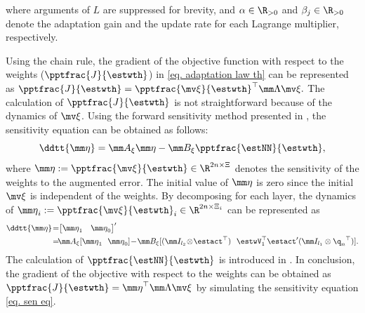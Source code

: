 \documentclass[letterpaper, 10 pt, conference]{ieeeconf}  %
\begin{document}
where arguments of $L$ are suppressed for brevity, and $\alpha\in\R_{>0}$ and $\beta_j\in\R_{>0}$ denote the adaptation gain and the update rate for each Lagrange multiplier, respectively.
\color{red}
\color{black}

Using the chain rule, the gradient of the objective function with respect to the weights (\ie $\pptfrac{J}{\estwth}$) in \eqref{eq. adaptation law th} can be represented as
$
    \pptfrac{J}{\estwth}
    =
    \pptfrac{\mv\xi}{\estwth}^\top 
    \mm \Lambda
    \mv\xi
    .
$
The calculation of $\pptfrac{J}{\estwth}$ is not straightforward because of the dynamics of $\mv\xi$.
Using the forward sensitivity method presented in \cite{Sengupta:2014aa}, the sensitivity equation can be obtained as follows:
\begin{equation}
    \ddtt{\mm \eta} =
    \mm A_\xi \mm\eta
    - \mm B_\xi 
    \pptfrac{\estNN}{\estwth}
    ,
    \label{eq. sen eq}
\end{equation}
where ${\mm \eta}:= \pptfrac{\mv\xi}{\estwth}\in\R^{2n\times \Xi}$ denotes the sensitivity of the weights to the augmented error.
The initial value of ${\mm \eta}$ is zero since the initial $\mv\xi$ is independent of the weights.
By decomposing for each layer, the dynamics of ${\mm \eta}_i:= \pptfrac{\mv\xi}{\estwth}_i\in\R^{2n\times \Xi_i}$ can be represented as
\begin{equation}
    \begin{aligned}
        \ddtt{\mm \eta} 
        \!=\!&
        \begin{bmatrix}
            {\mm \eta}_1&{\mm \eta}_0
        \end{bmatrix}'
        \\
        \!=\!&
        \mm A_\xi
        [
            {\mm \eta}_1
            \ \ 
            {\mm \eta}_0
        ]
        \!-\!
        \mm B_\xi
        [
            (\mm I_{l_2}\!\otimes\!\estact^\top )
            \ \ 
            \estwV_1^\top \estact'(\mm I_{l_1}\otimes {\q_{n}}^\top )
        ]
        .
    \end{aligned}
\end{equation}
The calculation of $\pptfrac{\estNN}{\estwth}$ is introduced in \cite{Patil:2022aa}.
In conclusion, the gradient of the objective with respect to the weights can be obtained as $\pptfrac{J}{\estwth} = {\mm \eta}^\top\mm \Lambda\mv\xi$ by simulating the sensitivity equation \eqref{eq. sen eq}.
\end{document}
